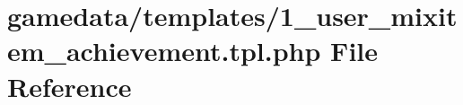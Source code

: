 \hypertarget{1__user__mixitem__achievement_8tpl_8php}{\section{gamedata/templates/1\+\_\+user\+\_\+mixitem\+\_\+achievement.tpl.\+php File Reference}
\label{1__user__mixitem__achievement_8tpl_8php}
}
